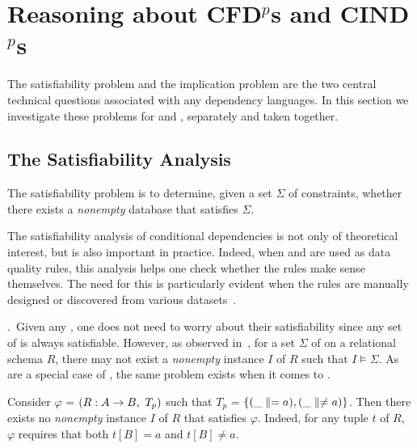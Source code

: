 \section{Reasoning about CFD$^p$s and CIND$^p$s}
\label{sec-reasoning}

The satisfiability problem and the implication problem are the two
central technical questions associated with any dependency languages.
In this section we investigate these
problems for \pCFDs and \pCINDs, separately and taken together.

\vspace{-1ex}
\subsection{The Satisfiability Analysis}

The satisfiability problem is to determine, given a set $\Sigma$ of
constraints, whether there exists a {\em nonempty} database that
satisfies $\Sigma$.

The satisfiability analysis of conditional dependencies is not only
of theoretical interest, but is also important in practice. Indeed,
when \pCFDs and \pCINDs are used as data quality rules, this
analysis helps one check whether the rules make sense themselves.
The need for this is particularly evident when the rules are
manually designed or discovered from various
datasets~\cite{CM08,divesh08,icde09}.

.~Given any
\FDs, one does not need to worry about their satisfiability
since any set of \FDs is always satisfiable. However, as observed
in~\cite{CFDs}, for a set $\Sigma$ of \CFDs on a relational schema
$R$, there may not exist a {\em nonempty} instance $I$ of $R$ such
that $I\models\Sigma$. As \CFDs are a special case of \pCFDs, the
same problem exists when it comes to \pCFDs.

\vspace{-0.5ex}
\begin{example}
\label{exam-sat-cfd} Consider \pCFD $\varphi$ = $(R: A\rightarrow
B,\ T_p)$ such that $T_p$ = $\{(\_\parallel = a), (\_ \parallel \ne a)\}$.
Then there exists no {\em nonempty} instance $I$ of $R$ that
satisfies $\varphi$. Indeed, for any tuple $t$ of $R$,
$\varphi$ requires that both $t[B] = a$ and
$t[B]\ne a$.
\eop
\end{example}
\vspace{-0.5ex}

